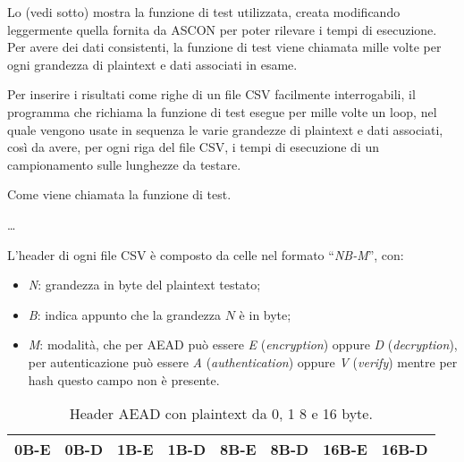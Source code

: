 Lo  (vedi sotto) mostra la funzione di test utilizzata, creata modificando leggermente quella fornita da ASCON per poter rilevare i tempi di esecuzione. Per avere dei dati consistenti, la funzione di test viene chiamata mille volte per ogni grandezza di plaintext e dati associati in esame.

\noindent Per inserire i risultati come righe di un file CSV facilmente interrogabili, il programma che richiama la funzione di test esegue per mille volte un loop, nel quale vengono usate in sequenza le varie grandezze di plaintext e dati associati, così da avere, per ogni riga del file CSV, i tempi di esecuzione di un campionamento sulle lunghezze da testare.

\begin{algorithm}
    \caption{Come viene chiamata la funzione di test.}
    \begin{algorithmic}[1]
            \State {}
            \State \dots
            \State {}
			\State {}
        \EndFor
    \end{algorithmic}
\end{algorithm}

\noindent L'header di ogni file CSV è composto da celle nel formato ``\textit{NB-M}'', con:
\begin{itemize}
    \item \textit{N}: grandezza in byte del plaintext testato;
    \item \textit{B}: indica appunto che la grandezza $N$ è in byte;
    \item \textit{M}: modalità, che per AEAD può essere \textit{E} (\textit{encryption}) oppure \textit{D} (\textit{decryption}), per autenticazione può essere \textit{A} (\textit{authentication}) oppure \textit{V} (\textit{verify}) mentre per hash questo campo non è presente.
\end{itemize}

\begin{table}[H]
    \centering
	\begin{tabular}{|c|c|c|c|c|c|c|c|}
		\hline
		0B-E & 0B-D & 1B-E & 1B-D & 8B-E & 8B-D & 16B-E & 16B-D \\
		\hline
    \end{tabular}
    \caption{Header AEAD con plaintext da 0, 1 8 e 16 byte.}
\end{table}

